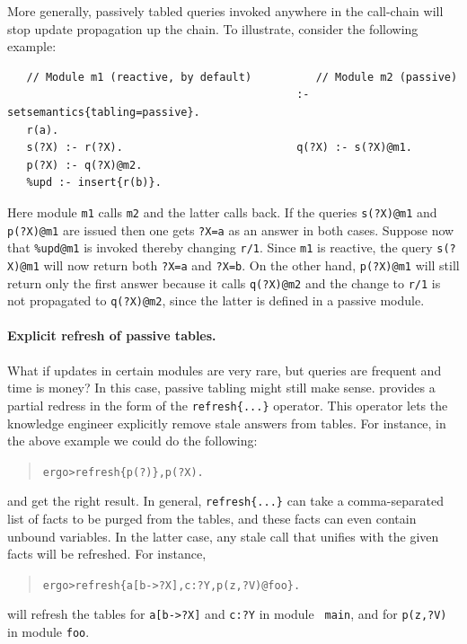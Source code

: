 \documentclass[11pt]{article}
\newcommand{\ERGO}{\mbox{\smaller{\ensuremath{\cal{E}}\smaller{{\sc{RGO}}}}}\xspace}
\newcommand{\FLSYSTEM}{\ERGO}
\newcommand{\prompt}{ergo> }
\begin{document}
More generally, passively tabled queries invoked anywhere in the call-chain
will stop update propagation
up the chain. To illustrate, consider the following example:
\begin{verbatim}
   // Module m1 (reactive, by default)          // Module m2 (passive)
                                             :- setsemantics{tabling=passive}.
   r(a).                                     
   s(?X) :- r(?X).                           q(?X) :- s(?X)@m1.
   p(?X) :- q(?X)@m2.
   %upd :- insert{r(b)}.
\end{verbatim}
Here module \texttt{m1}  calls \texttt{m2} and the latter calls back. If
the queries \texttt{s(?X)@m1} and
\texttt{p(?X)@m1} are issued then one gets \texttt{?X=a} as an
answer in both cases. Suppose now that \texttt{\%upd@m1} is invoked thereby changing
\texttt{r/1}. Since \texttt{m1} is reactive, the query \texttt{s(?X)@m1}
will now return both \texttt{?X=a} and \texttt{?X=b}. On the other hand,
\texttt{p(?X)@m1} will still return only the first answer because it calls
\texttt{q(?X)@m2} and the change to \texttt{r/1} is not propagated to
\texttt{q(?X)@m2}, since the latter is defined in a passive module. 



\paragraph{Explicit refresh of passive tables.}
What if updates in certain modules are very rare, but queries are
frequent and time is money?
In this case, passive tabling might still make sense.
\FLSYSTEM provides a partial redress in the form of
the {\tt refresh\{...\}} operator. This operator
lets the knowledge engineer explicitly
remove stale answers from tables. For instance, in the above example we could
do the following:
\begin{quote}
\begin{alltt}
\prompt refresh\{p(?)\}, p(?X).
\end{alltt}
\end{quote}
and get the right result.
In general, {\tt refresh\{...\}} can take a comma-separated list of facts to
be purged from the tables, and these facts can even contain unbound variables.
In the latter case, any stale call that unifies with the given facts will
be refreshed. For instance,
\begin{quote}
\begin{alltt}
\prompt refresh\{a[b->?X], c:?Y, p(z,?V)@foo\}.
\end{alltt}
\end{quote}
will refresh the tables for {\tt a[b->?X]} and {\tt c:?Y} in module {\tt
  main}, and for {\tt p(z,?V)} in module {\tt foo}.
\end{document}
